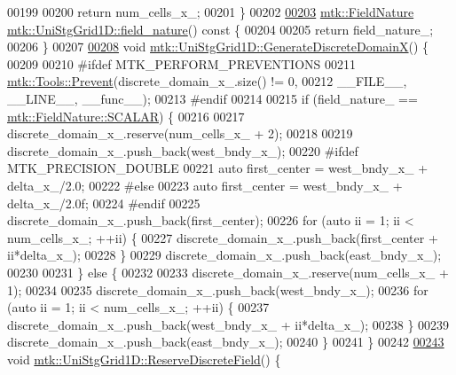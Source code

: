 \begin{DoxyCode}
00199 
00200   \textcolor{keywordflow}{return} num\_cells\_x\_;
00201 \}
00202 
\hypertarget{mtk__uni__stg__grid__1d_8cc_source_l00203}{}\hyperlink{classmtk_1_1UniStgGrid1D_a6f6a5a23011fe90971ed6b8f5f640cd2}{00203} \hyperlink{group__c02-enums_ga4c54f2a329cfb4e56213b02a259d19e2}{mtk::FieldNature} \hyperlink{classmtk_1_1UniStgGrid1D_a6f6a5a23011fe90971ed6b8f5f640cd2}{mtk::UniStgGrid1D::field\_nature}()\textcolor{keyword}{ const }\{
00204 
00205   \textcolor{keywordflow}{return} field\_nature\_;
00206 \}
00207 
\hypertarget{mtk__uni__stg__grid__1d_8cc_source_l00208}{}\hyperlink{classmtk_1_1UniStgGrid1D_a36a7a85e237a4f85c603eac8cf67a704}{00208} \textcolor{keywordtype}{void} \hyperlink{classmtk_1_1UniStgGrid1D_a36a7a85e237a4f85c603eac8cf67a704}{mtk::UniStgGrid1D::GenerateDiscreteDomainX}() \{
00209 
00210 \textcolor{preprocessor}{  #ifdef MTK\_PERFORM\_PREVENTIONS}
00211   \hyperlink{classmtk_1_1Tools_a332324c6f25e66be9dff48c5987a3b9f}{mtk::Tools::Prevent}(discrete\_domain\_x\_.size() != 0,
00212                       \_\_FILE\_\_, \_\_LINE\_\_, \_\_func\_\_);
00213 \textcolor{preprocessor}{  #endif}
00214 
00215   \textcolor{keywordflow}{if} (field\_nature\_ == \hyperlink{namespacemtk_ga4c54f2a329cfb4e56213b02a259d19e2a8f3d9a4b6a7b7f2c7afa61ca113d0db9}{mtk::FieldNature::SCALAR}) \{
00216 
00217     discrete\_domain\_x\_.reserve(num\_cells\_x\_ + 2);
00218 
00219     discrete\_domain\_x\_.push\_back(west\_bndy\_x\_);
00220 \textcolor{preprocessor}{    #ifdef MTK\_PRECISION\_DOUBLE}
00221     \textcolor{keyword}{auto} first\_center = west\_bndy\_x\_ + delta\_x\_/2.0;
00222 \textcolor{preprocessor}{    #else}
00223     \textcolor{keyword}{auto} first\_center = west\_bndy\_x\_ + delta\_x\_/2.0f;
00224 \textcolor{preprocessor}{    #endif}
00225     discrete\_domain\_x\_.push\_back(first\_center);
00226     \textcolor{keywordflow}{for} (\textcolor{keyword}{auto} ii = 1; ii < num\_cells\_x\_; ++ii) \{
00227       discrete\_domain\_x\_.push\_back(first\_center + ii*delta\_x\_);
00228     \}
00229     discrete\_domain\_x\_.push\_back(east\_bndy\_x\_);
00230 
00231   \} \textcolor{keywordflow}{else} \{
00232 
00233     discrete\_domain\_x\_.reserve(num\_cells\_x\_ + 1);
00234 
00235     discrete\_domain\_x\_.push\_back(west\_bndy\_x\_);
00236     \textcolor{keywordflow}{for} (\textcolor{keyword}{auto} ii = 1; ii < num\_cells\_x\_; ++ii) \{
00237       discrete\_domain\_x\_.push\_back(west\_bndy\_x\_ + ii*delta\_x\_);
00238     \}
00239     discrete\_domain\_x\_.push\_back(east\_bndy\_x\_);
00240   \}
00241 \}
00242 
\hypertarget{mtk__uni__stg__grid__1d_8cc_source_l00243}{}\hyperlink{classmtk_1_1UniStgGrid1D_a43ce8a21fa723ac444b92d02ef6782e7}{00243} \textcolor{keywordtype}{void} \hyperlink{classmtk_1_1UniStgGrid1D_a43ce8a21fa723ac444b92d02ef6782e7}{mtk::UniStgGrid1D::ReserveDiscreteField}() \{

\end{DoxyCode}
